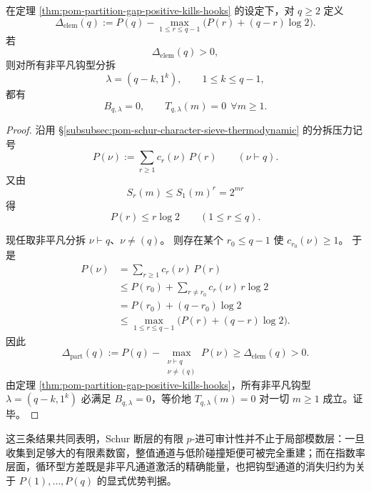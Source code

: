 \begin{theorem}[单变量压力优势强制全部非平凡钩型通道湮灭]\label{thm:xi-time-part63-elementary-pressure-gap-kills-hooks}
在定理 \ref{thm:pom-partition-gap-positive-kills-hooks} 的设定下，对 \(q\ge 2\) 定义
\[
\Delta_{\mathrm{elem}}(q):=
P(q)-
\max_{1\le r\le q-1}\bigl(P(r)+(q-r)\log 2\bigr).
\]
若
\[
\Delta_{\mathrm{elem}}(q)>0,
\]
则对所有非平凡钩型分拆
\[
\lambda=(q-k,1^k),\qquad 1\le k\le q-1,
\]
都有
\[
\boxed{\;
B_{q,\lambda}=0,
\qquad
T_{q,\lambda}(m)=0\ \ \forall m\ge 1.\;}
\]
\end{theorem}
\begin{proof}
沿用 \S\ref{subsubsec:pom-schur-character-sieve-thermodynamic} 的分拆压力记号
\[
P(\nu):=\sum_{r\ge 1}c_r(\nu)\,P(r)\qquad(\nu\vdash q).
\]
又由
\[
S_r(m)\le S_1(m)^r=2^{mr}
\]
得
\[
P(r)\le r\log 2\qquad(1\le r\le q).
\]

现任取非平凡分拆 \(\nu\vdash q\)、\(\nu\neq(q)\)。
则存在某个 \(r_0\le q-1\) 使 \(c_{r_0}(\nu)\ge 1\)。
于是
\[
\begin{aligned}
P(\nu)
&=
\sum_{r\ge 1}c_r(\nu)\,P(r)\\
&\le
P(r_0)+
\sum_{r\neq r_0}c_r(\nu)\,r\log 2\\
&=
P(r_0)+(q-r_0)\log 2\\
&\le
\max_{1\le r\le q-1}\bigl(P(r)+(q-r)\log 2\bigr).
\end{aligned}
\]
因此
\[
\Delta_{\mathrm{part}}(q)
:=
P(q)-\max_{\substack{\nu\vdash q\\ \nu\neq(q)}}P(\nu)
\ge
\Delta_{\mathrm{elem}}(q)>0.
\]
由定理 \ref{thm:pom-partition-gap-positive-kills-hooks}，所有非平凡钩型
\(\lambda=(q-k,1^k)\) 必满足 \(B_{q,\lambda}=0\)，等价地
\(
T_{q,\lambda}(m)=0
\)
对一切 \(m\ge 1\) 成立。证毕。
\end{proof}

\noindent
这三条结果共同表明，Schur 断层的有限 \(p\)-进可审计性并不止于局部模数层：一旦收集到足够大的有限素数窗，整值通道与低阶碰撞矩便可被完全重建；而在指数率层面，循环型方差既是非平凡通道激活的精确能量，也把钩型通道的消失归约为关于 \(P(1),\dots,P(q)\) 的显式优势判据。






\endinput
